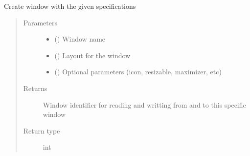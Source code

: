 \documentclass[letterpaper,10pt,english]{sphinxmanual}
\begin{document}
\begin{fulllineitems}
\begin{fulllineitems}
\label{\detokenize{interface:interface.Interface.create_window}}
\sphinxAtStartPar
Create window with the given specifications
\begin{quote}\begin{description}
\item[{Parameters}] \leavevmode\begin{itemize}
\item {} 
\sphinxAtStartPar
{} () \textendash{} Window name

\item {} 
\sphinxAtStartPar
{} (\sphinxstyleliteralemphasis{\sphinxupquote{{[}}}\sphinxstyleliteralemphasis{\sphinxupquote{{[}}}\sphinxstyleliteralemphasis{\sphinxupquote{{]}}}\sphinxstyleliteralemphasis{\sphinxupquote{{]}}}) \textendash{} Layout for the window

\item {} 
\sphinxAtStartPar
{} () \textendash{} Optional parameters (icon, resizable, maximizer, etc)

\end{itemize}

\item[{Returns}] \leavevmode
\sphinxAtStartPar
Window identifier for reading and writting from and to this specific window

\item[{Return type}] \leavevmode
\sphinxAtStartPar
int

\end{description}\end{quote}

\end{fulllineitems}



\end{fulllineitems}
\end{document}
